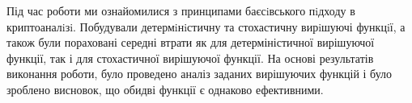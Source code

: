 
 Під час роботи ми ознайомилися з принципами баєсiвського пiдходу в криптоаналiзi. Побудували детермiнiстичну та стохастичну вирiшуючі функцiї, а також були пораховані середні втрати як для детерміністичної вирішуючої функції, так і для стохастичної вирішуючої функції. На основі результатів виконання роботи, було проведено аналіз заданих вирішуючих функцій і було зроблено висновок, що обидві функції є однаково ефективними.  